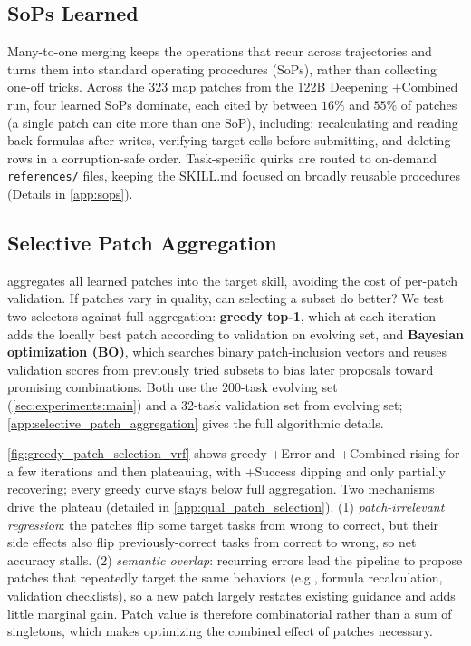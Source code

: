 \subsection{SoPs Learned}
\label{sec:analysis:sops}

Many-to-one merging keeps the operations that recur across trajectories and turns them into standard operating procedures (SoPs), rather than collecting one-off tricks.
Across the 323 map patches from the 122B Deepening +Combined run, four learned SoPs dominate, each cited by between $16\%$ and $55\%$ of patches (a single patch can cite more than one SoP), including: recalculating and reading back formulas after writes, verifying target cells before submitting, and deleting rows in a corruption-safe order.
Task-specific quirks are routed to on-demand \texttt{references/} files, keeping the SKILL.md focused on broadly reusable procedures (Details in \cref{app:sops}).

\subsection{Selective Patch Aggregation}
\label{sec:analysis:selective_patch_aggregation}

\systemname{} aggregates all learned patches into the target skill, avoiding the cost of per-patch validation. If patches vary in quality, can selecting a subset do better? We test two selectors against full aggregation: \textbf{greedy top-1}, which at each iteration adds the locally best patch according to validation on evolving set, and \textbf{Bayesian optimization (BO)}, which searches binary patch-inclusion vectors and reuses validation scores from previously tried subsets to bias later proposals toward promising combinations. Both use the 200-task evolving set (\cref{sec:experiments:main}) and a 32-task validation set from evolving set; \cref{app:selective_patch_aggregation} gives the full algorithmic details.

\cref{fig:greedy_patch_selection_vrf} shows greedy +Error and +Combined rising for a few iterations and then plateauing, with +Success dipping and only partially recovering; every greedy curve stays below full \systemname{} aggregation.
Two mechanisms drive the plateau (detailed in \cref{app:qual_patch_selection}).
(1) \emph{patch-irrelevant regression}: the patches flip some target tasks from wrong to correct, but their side effects also flip previously-correct tasks from correct to wrong, so net accuracy stalls.
(2) \emph{semantic overlap}: recurring errors lead the pipeline to propose patches that repeatedly target the same behaviors (e.g., formula recalculation, validation checklists), so a new patch largely restates existing guidance and adds little marginal gain.
Patch value is therefore combinatorial rather than a sum of singletons, which makes optimizing the combined effect of patches necessary.

